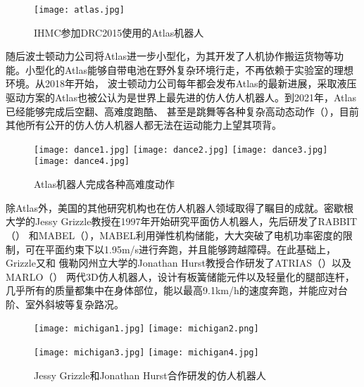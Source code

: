 \begin{figure}[htbp]
    \centering
    \texttt{[image: atlas.jpg]}
    \caption{\label{fig:atlas}IHMC参加DRC2015使用的Atlas机器人}
\end{figure}
随后波士顿动力公司将Atlas进一步小型化，为其开发了人机协作搬运货物等功能。小型化的Atlas能够自带电池在野外复杂环境行走，不再依赖于实验室的理想环境。从2018年开始，
波士顿动力公司每年都会发布Atlas的最新进展，采取液压驱动方案的Atlas也被公认为是世界上最先进的仿人仿人机器人。到2021年，Atlas已经能够完成后空翻、高难度跑酷、
甚至是跳舞等各种复杂高动态动作（），目前其他所有公开的仿人仿人机器人都无法在运动能力上望其项背。
\begin{figure}[htbp]
    \centering
    \texttt{[image: dance1.jpg]}
    \texttt{[image: dance2.jpg]}
    \texttt{[image: dance3.jpg]}
    \texttt{[image: dance4.jpg]}
    \caption{\label{fig:atlas_dance}Atlas机器人完成各种高难度动作}
\end{figure}
除Atlas外，美国的其他研究机构也在仿人机器人领域取得了瞩目的成就。密歇根大学的Jessy Grizzle教授在1997年开始研究平面仿人机器人，先后研发了RABBIT（）
和MABEL（），MABEL利用弹性机构储能，大大突破了电机功率密度的限制，可在平面约束下以1.95m/s进行奔跑，并且能够跨越障碍。在此基础上，Grizzle又和
俄勒冈州立大学的Jonathan Hurst教授合作研发了ATRIAS\cite{rezazadeh2015toward}（）以及MARLO\cite{buss2014preliminary}（）
两代3D仿人机器人，设计有板簧储能元件以及轻量化的腿部连杆，几乎所有的质量都集中在身体部位，能以最高9.1km/h的速度奔跑，并能应对台阶、室外斜坡等复杂路况。
\begin{figure}[htbp]
    \centering
        {%
            \texttt{[image: michigan1.jpg]}}
        {%
            \texttt{[image: michigan2.png]}}

        {%
            \texttt{[image: michigan3.jpg]}}
        {%
            \texttt{[image: michigan4.jpg]}}
    \caption{Jessy Grizzle和Jonathan Hurst合作研发的仿人机器人\label{fig:michigan_biped}}
\end{figure}
